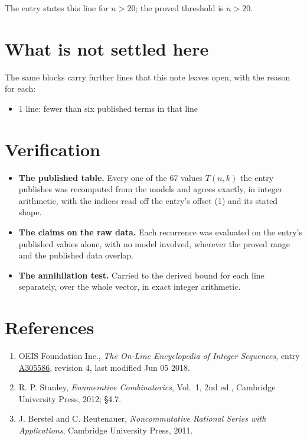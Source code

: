\documentclass[11pt]{article}
\theoremstyle{definition}
\begin{document}
The entry states this line for $n > 20$; the proved threshold is $n > 20$.

\section{What is not settled here}

The same blocks carry further lines that this note leaves open, with the reason for each:

\begin{itemize}

\item 1 line: fewer than six published terms in that line

\end{itemize}

\section{Verification}

\begin{itemize}

\item {\bfseries The published table.} Every one of the 67 values $T(n,k)$ the entry publishes was recomputed from the models and agrees exactly, in integer arithmetic, with the indices read off the entry's offset (1) and its stated shape.

\item {\bfseries The claims on the raw data.} Each recurrence was evaluated on the entry's published values alone, with no model involved, wherever the proved range and the published data overlap.

\item {\bfseries The annihilation test.} Carried to the derived bound for each line separately, over the whole vector, in exact integer arithmetic.

\end{itemize}

\section{References}

\begin{enumerate}

\item OEIS Foundation Inc., \emph{The On-Line Encyclopedia of Integer Sequences}, entry \href{https://oeis.org/A305586}{A305586}, revision 4, last modified Jun 05 2018.

\item R. P. Stanley, \emph{Enumerative Combinatorics}, Vol.~1, 2nd ed., Cambridge University Press, 2012; \S4.7.

\item J. Berstel and C. Reutenauer, \emph{Noncommutative Rational Series with Applications}, Cambridge University Press, 2011.

\end{enumerate}
\end{document}
